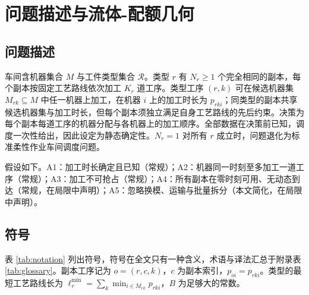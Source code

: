 \section{问题描述与流体-配额几何}\label{sec:problem}

\subsection{问题描述}\label{sec:problem-desc}
车间含机器集合 $M$ 与工件类型集合 $\mathcal{R}$。类型 $r$ 有 $N_r \ge 1$ 个完全相同的副本，每个副本按固定工艺路线依次加工 $K_r$ 道工序。类型工序 $(r,k)$ 可在候选机器集 $M_{rk} \subseteq M$ 中任一机器上加工，在机器 $i$ 上的加工时长为 $p_{rki}$；同类型的副本共享候选机器集与加工时长，但每个副本须独立满足自身工艺路线的先后约束。决策为每个副本每道工序的机器分配与各机器上的加工顺序。全部数据在决策前已知，调度一次性给出，因此设定为静态确定性。$N_r = 1$ 对所有 $r$ 成立时，问题退化为标准柔性作业车间调度问题。

假设如下。A1：加工时长确定且已知（常规）；A2：机器同一时刻至多加工一道工序（常规）；A3：加工不可抢占（常规）；A4：所有副本在零时刻可用、无动态到达（常规，在局限中声明）；A5：忽略换模、运输与批量拆分（本文简化，在局限中声明）。

\subsection{符号}\label{sec:notation}
表 \ref{tab:notation} 列出符号，符号在全文只有一种含义，术语与译法汇总于附录表 \ref{tab:glossary}。副本工序记为 $o = (r,c,k)$，$c$ 为副本索引，$p_{oi} = p_{rki}$。类型的最短工艺路线长为 $\ell_r^{\min} = \sum_k \min_{i \in M_{rk}} p_{rki}$，$B$ 为足够大的常数。

